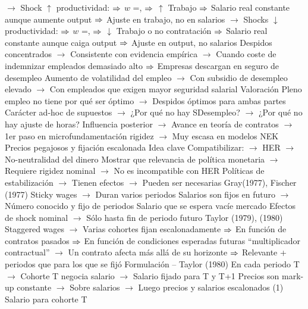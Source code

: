 \documentclass{nuevotema}
\begin{document}
\begin{esquemal}
				\4[] $\to$ Shock $\uparrow$ productividad:
				\4[] $\Rightarrow$ $w$ =,
				\4[] $\Rightarrow$ $\uparrow$ Trabajo
				\4[] $\Rightarrow$ Salario real constante aunque aumente output
				\4[] $\Rightarrow$ Ajuste en trabajo, no en salarios
				\4[] $\to$ Shocks $\downarrow$ productividad:
				\4[] $\Rightarrow$ $w$ =,
				\4[] $\Rightarrow$ $\downarrow$ Trabajo o no contratación
				\4[] $\Rightarrow$ Salario real constante aunque caiga output
				\4[] $\Rightarrow$ Ajuste en output, no salarios
				\4[] Despidos concentrados
				\4[] $\to$ Consistente con evidencia empírica
				\4[] $\to$ Cuando coste de indemnizar empleados demasiado alto
				\4[] $\Rightarrow$ Empresas descargan en seguro de desempleo
				\4[] Aumento de volatilidad del empleo
				\4[] $\to$ Con subsidio de desempleo elevado
				\4[] $\to$ Con empleados que exigen mayor seguridad salarial
				\4 Valoración
				\4[] Pleno empleo no tiene por qué ser óptimo
				\4[] $\to$ Despidos óptimos para ambas partes
				\4[] Carácter ad-hoc de supuestos
				\4[] $\to$ ¿Por qué no hay SDesempleo?
				\4[] $\to$ ¿Por qué no hay ajuste de horas?
				\4[] Influencia posterior
				\4[] $\to$ Avance en teoría de contratos
				\4[] $\to$ 1er paso en microfundamentación rigidez
				\4[] $\to$ Muy escasa en modelos NEK
			\3 Precios pegajosos y fijación escalonada
				\4 Idea clave
				\4[] Compatibilizar:
				\4[] $\to$ HER
				\4[] $\to$ No-neutralidad del dinero
				\4[] Mostrar que relevancia de política monetaria
				\4[] $\to$ Requiere rigidez nominal
				\4[] $\to$ No es incompatible con HER
				\4[] Políticas de estabilización
				\4[] $\to$ Tienen efectos
				\4[] $\to$ Pueden ser necesarias
				\4 Gray(1977), Fischer (1977)
				\4[] Sticky wages
				\4[] $\to$ Duran varios periodos
				\4[] Salarios son fijos en futuro
				\4[] $\to$ Número conocido y fijo de periodos
				\4[] Salario que se espera vacíe mercado
				\4[] Efectos de shock nominal
				\4[] $\to$ Sólo hasta fin de periodo futuro
				\4 Taylor (1979), (1980)
				\4[] Staggered wages
				\4[] $\to$ Varias cohortes fijan escalonadamente
				\4[] $\Rightarrow$ En función de contratos pasados
				\4[] $\Rightarrow$ En función de condiciones esperadas futuras
				\4[] ``multiplicador contractual''
				\4[] $\to$ Un contrato afecta más allá de su horizonte
				\4[] $\Rightarrow$ Relevante + periodos que para los que se fijó
				\4 Formulación -- Taylor (1980)
				\4[] En cada periodo T
				\4[] $\to$ Cohorte T negocia salario
				\4[] $\to$ Salario fijado para T y T+1
				\4[] Precios son mark-up constante
				\4[] $\to$ Sobre salarios
				\4[] $\to$ Luego precios y salarios escalonados
				\4[] (1) Salario para cohorte T

\end{esquemal}
\end{document}
